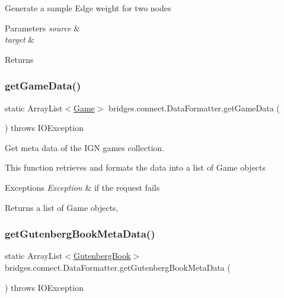 Generate a sample Edge weight for two nodes 
\begin{DoxyParams}{Parameters}
{\em source} & \\
\hline
{\em target} & \\
\hline
\end{DoxyParams}
\begin{DoxyReturn}{Returns}

\end{DoxyReturn}
\mbox{\label{classbridges_1_1connect_1_1_data_formatter_a4098317468be22b4284156d6cd2212e1}} 
\subsubsection{\texorpdfstring{getGameData()}{getGameData()}}
{\footnotesize\ttfamily static Array\+List$<$\mbox{\hyperlink{classbridges_1_1data__src__dependent_1_1_game}{Game}}$>$ bridges.\+connect.\+Data\+Formatter.\+get\+Game\+Data (\begin{DoxyParamCaption}{ }\end{DoxyParamCaption}) throws I\+O\+Exception\hspace{0.3cm}{\ttfamily [static]}}

Get meta data of the I\+GN games collection.

This function retrieves and formats the data into a list of Game objects


\begin{DoxyExceptions}{Exceptions}
{\em Exception} & if the request fails\\
\hline
\end{DoxyExceptions}
\begin{DoxyReturn}{Returns}
a list of Game objects, 
\end{DoxyReturn}
\mbox{\label{classbridges_1_1connect_1_1_data_formatter_a4bd21bd830238db40b511474afc77b61}} 
\subsubsection{\texorpdfstring{getGutenbergBookMetaData()}{getGutenbergBookMetaData()}}
{\footnotesize\ttfamily static Array\+List$<$\mbox{\hyperlink{classbridges_1_1data__src__dependent_1_1_gutenberg_book}{Gutenberg\+Book}}$>$ bridges.\+connect.\+Data\+Formatter.\+get\+Gutenberg\+Book\+Meta\+Data (\begin{DoxyParamCaption}{ }\end{DoxyParamCaption}) throws I\+O\+Exception\hspace{0.3cm}{\ttfamily [static]}}

